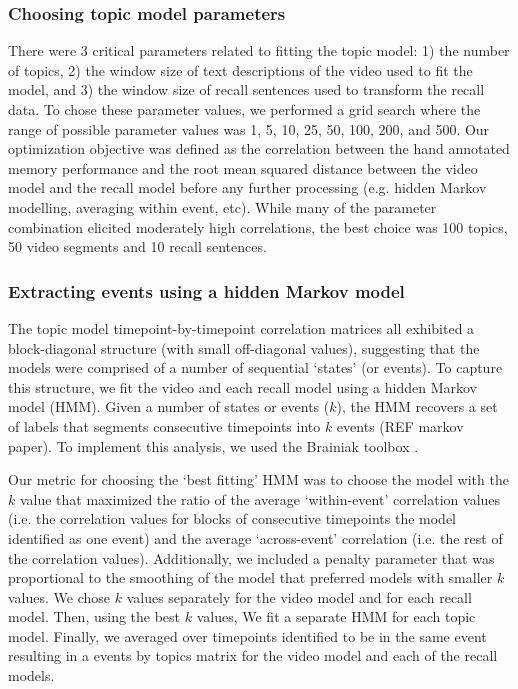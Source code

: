 \documentclass{article}
\begin{document}
{\subsubsection{Choosing topic model parameters}
There were 3 critical parameters related to fitting the topic model: 1) the number of topics, 2) the window size of text descriptions of the video used to fit the model, and 3) the window size of recall sentences used to transform the recall data.  To chose these parameter values, we performed a grid search where the range of possible parameter values was 1, 5, 10, 25, 50, 100, 200, and 500. Our optimization objective was defined as the correlation between the hand annotated memory performance and the root mean squared distance between the video model and the recall model before any further processing (e.g. hidden Markov modelling, averaging within event, etc). While many of the parameter combination elicited moderately high correlations, the best choice was 100 topics, 50 video segments and 10 recall sentences.

\subsubsection{Extracting events using a hidden Markov model}
The topic model timepoint-by-timepoint correlation matrices all exhibited a block-diagonal structure (with small off-diagonal values), suggesting that the models were comprised of a number of sequential `states' (or events). To capture this structure, we fit the video and each recall model using a hidden Markov model (HMM). Given a number of states or events ($k$), the HMM recovers a set of labels that segments consecutive timepoints into $k$ events (REF markov paper). To implement this analysis, we used the Brainiak toolbox \citep{BaldEtal17}.

Our metric for choosing the `best fitting' HMM was to choose the model with the $k$ value that maximized the ratio of the average `within-event' correlation values (i.e. the correlation values for blocks of consecutive timepoints the model identified as one event) and the average `across-event' correlation (i.e. the rest of the correlation values). Additionally, we included a penalty parameter that was proportional to the smoothing of the model that preferred models with smaller $k$ values. We chose $k$ values separately for the video model and for each recall model.  Then, using the best $k$ values, We fit a separate HMM for each topic model. Finally, we averaged over timepoints identified to be in the same event resulting in a events by topics matrix for the video model and each of the recall models.
%
}
\end{document}
